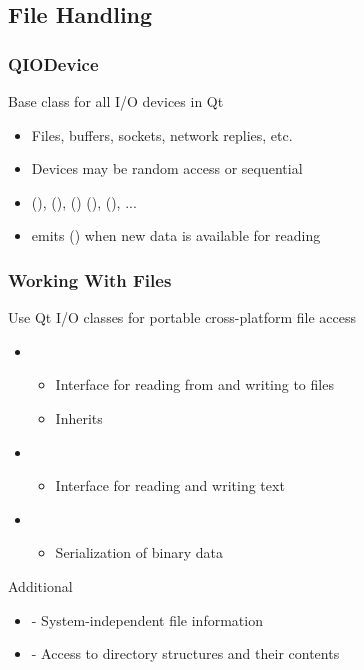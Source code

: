 \subsection{File Handling}


\begin{slide}\frametitle{QIODevice}
  Base class for all I/O devices in Qt
  \begin{itemize}
    \item Files, buffers, sockets, network replies, etc.
    \item Devices may be random access or sequential
    \item {}(), (), () (), (), ...
    \item emits () when new data is available for reading
  \end{itemize}

\end{slide}


\begin{slide}\frametitle{Working With Files}
  Use Qt I/O classes for portable cross-platform file access
  \begin{itemize}
    \item {}
    \begin{itemize}
      \item Interface for reading from and writing to files
      \item Inherits 
    \end{itemize}
    \item {}
    \begin{itemize}
      \item Interface for reading and writing text
    \end{itemize}
    \item {}
    \begin{itemize}
      \item Serialization of binary data
    \end{itemize}  \end{itemize}
  Additional
  \begin{itemize}
    \item {} - System-independent file information
    \item {} - Access to directory structures and their contents
  \end{itemize}
\end{slide}

